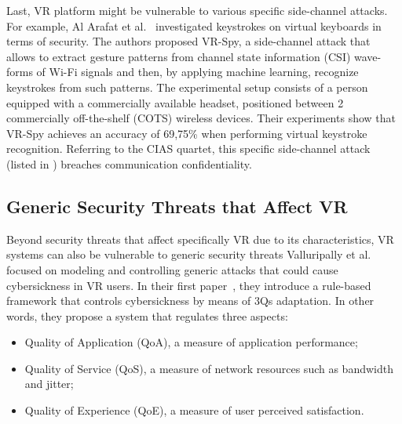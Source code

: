 \documentclass[journal]{IEEEtran}
\newcommand{\xmark}{\textcolor{red}{\ding{55}}}%
\begin{document}
Last, VR platform might be vulnerable to various specific side-channel attacks. For example, Al Arafat et al.~\cite{arafat2021} investigated keystrokes on virtual keyboards in terms of security. The authors proposed VR-Spy, a side-channel attack that allows to extract gesture patterns from channel state information (CSI) wave-forms of Wi-Fi signals and then, by applying machine learning, recognize keystrokes from such patterns. The experimental setup consists of a person equipped with a commercially available headset, positioned between 2 commercially off-the-shelf (COTS) wireless devices. Their experiments show that VR-Spy achieves an accuracy of 69,75\% when performing virtual keystroke recognition. Referring to the CIAS quartet, this specific side-channel attack (listed in ) breaches communication confidentiality.





\subsection{Generic Security Threats that Affect VR}
Beyond security threats that affect specifically VR due to its characteristics, VR systems can also be vulnerable to generic security threats
Valluripally et al.~\cite{valluripally2021rule,valluripally2020,valluripally2021modeling} focused on modeling and controlling generic attacks that could cause cybersickness in VR users. In their first paper~\cite{valluripally2021rule}, they introduce a rule-based framework that controls cybersickness by means of 3Qs adaptation. In other words, they propose a system that regulates three aspects:
\begin{itemize}
    \item Quality of Application (QoA), a measure of application performance;
    \item Quality of Service (QoS), a measure of network resources such as bandwidth and jitter;
    \item Quality of Experience (QoE), a measure of user perceived satisfaction.
\end{itemize}
\end{document}
